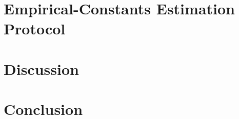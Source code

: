 \documentclass[conference]{IEEEtran}
\def\SHAREDLATEX{../../latex}
\newcommand{\headlip}{L_H}
\newcommand{\deplag}{\Delta}
\newcommand{\klcoef}{\mu}
\newcommand{\composite}{\stab^{\mathrm{comp}}}
\begin{document}
\section{Empirical-Constants Estimation Protocol}
\label{sec:constants}

\section{Discussion}
\label{sec:discussion}

\section{Conclusion}
\label{sec:conclusion}

\nocite{borkar2008stochastic}
\nocite{tsitsiklis1997td}
\nocite{bishop2006prml}


\end{document}
